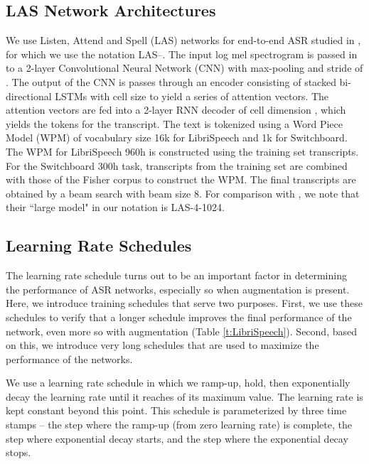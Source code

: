 \documentclass[a4paper]{article}
\begin{document}
\subsection{LAS Network Architectures}

We use Listen, Attend and Spell (LAS) networks \cite{Chan2016ListenAA} for end-to-end ASR studied in \cite{irie-arxiv-2019}, for which we use the notation LAS--. The input log mel spectrogram is passed in to a 2-layer Convolutional Neural Network (CNN) with max-pooling and stride of . The output of the CNN is passes through an encoder consisting of  stacked bi-directional LSTMs with cell size  to yield a series of attention vectors. The attention vectors are fed into a 2-layer RNN decoder of cell dimension , which yields the tokens for the transcript. The text is tokenized using a Word Piece Model (WPM) \cite{schuster-icassp-2012} of vocabulary size 16k for LibriSpeech and 1k for Switchboard. The WPM for LibriSpeech 960h is constructed using the training set transcripts. For the Switchboard 300h task, transcripts from the training set are combined with those of the Fisher corpus to construct the WPM. The final transcripts are obtained by a beam search with beam size 8. For comparison with \cite{irie-arxiv-2019}, we note that their ``large model" in our notation is LAS-4-1024.

\subsection{Learning Rate Schedules}

The learning rate schedule turns out to be an important factor in determining the performance of ASR networks, especially so when augmentation is present. Here, we introduce training schedules that serve two purposes. First, we use these schedules to verify that a longer schedule improves the final performance of the network, even more so with augmentation (Table \ref{t:LibriSpeech}). Second, based on this, we introduce very long schedules that are used to maximize the performance of the networks.

We use a learning rate schedule in which we ramp-up, hold, then exponentially decay the learning rate until it reaches  of its maximum value. The learning rate is kept constant beyond this point. This schedule is parameterized by three time stamps  -- the step  where the ramp-up (from zero learning rate) is complete, the step  where exponential decay starts, and the step  where the exponential decay stops.
\end{document}
